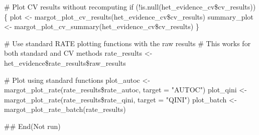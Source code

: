 \documentclass[a4paper]{book}
\begin{document}
\begin{Arguments}
\# Plot CV results without recomputing
if (!is.null(het\_evidence\_cv\$cv\_results)) \{
  plot <- margot\_plot\_cv\_results(het\_evidence\_cv\$cv\_results)
  summary\_plot <- margot\_plot\_cv\_summary(het\_evidence\_cv\$cv\_results)
\}

\# Use standard RATE plotting functions with the raw results
\# This works for both standard and CV methods
rate\_results <- het\_evidence\$rate\_results\$raw\_results

\# Plot using standard functions
plot\_autoc <- margot\_plot\_rate(rate\_results\$rate\_autoc, target = "AUTOC")
plot\_qini <- margot\_plot\_rate(rate\_results\$rate\_qini, target = "QINI")
plot\_batch <- margot\_plot\_rate\_batch(rate\_results)

## End(Not run)


\end{Arguments}
\printindex{}
\end{document}
